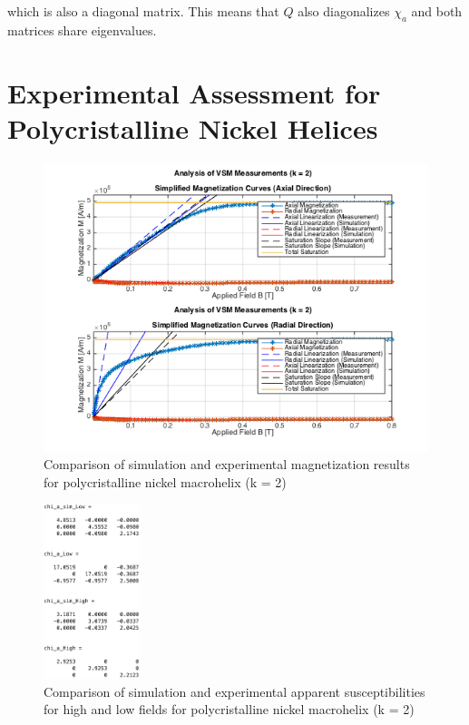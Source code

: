 which is also a diagonal matrix. This means that $Q$ also diagonalizes $\chi_a$ and both matrices share eigenvalues.

\clearpage

\section{Experimental Assessment for Polycristalline Nickel Helices}
\label{s:ExperimentalResults}

\begin{figure}[h]
	\centering
  \includegraphics[width=1\textwidth]{Pictures/ExperimentalAssessk2.png}
	\caption{Comparison of simulation and experimental magnetization results for polycristalline nickel macrohelix (k = 2)}
	\label{fig:ExperimentalAssessk2}
\end{figure}

\begin{figure}[h]
	\centering
  \includegraphics[width=0.25\textwidth]{Pictures/ExperimentalAssessk2chi.png}
	\caption{Comparison of simulation and experimental apparent susceptibilities for high and low fields for polycristalline nickel macrohelix (k = 2)}
	\label{fig:ExperimentalAssessk2chi}
\end{figure}


